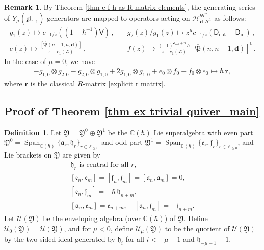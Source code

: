 \documentclass[10pt]{amsart}
\theoremstyle{definition}
\newtheorem{Definition}[Theorem]{Definition}
\newtheorem{Remark}[Theorem]{Remark}
\numberwithin{equation}{section}
\newcommand{\bC}{\mathbb{C}}
\newcommand{\bZ}{\mathbb{Z}}
\newcommand{\bd}{\mathbf{d}}
\newcommand{\cH}{\mathcal{H}}
\newcommand{\sA}{\mathsf{A}}
\newcommand{\sW}{\mathsf{W}}
\newcommand{\Span}{\operatorname{Span}}
\newcommand{\In}{\operatorname{in}}
\newcommand{\Out}{\operatorname{out}}
\begin{document}
\begin{Remark}
By Theorem \ref{thm e f h as R matrix elements}, the generating series of $Y_\mu(\mathfrak{gl}_{1|1})$ generators are mapped to operators acting on $\cH^{\sW^{\mathrm{fr}}}_{\underline{\bd},\sA^{\mathrm{fr}}}$ as follows:
\begin{align*}
g_1(z)\mapsto c_{-1/z}((1-\hbar^{-1})\mathsf V)\,, \quad & g_2(z)/g_1(z)\mapsto z^{\mu}c_{-1/z}(\mathsf D_{\Out}-\mathsf D_{\In})\,,\\
e(z)\mapsto \frac{[\overline{\mathfrak{P}}(n+1,n,\underline{\bd})]}{z-c_1(\mathcal L)}\,,\quad & f(z)\mapsto \frac{(-1)^{\bd_{\Out}+n}\,\hbar}{z-c_1(\mathcal L)}[\overline{\mathfrak{P}}(n,n-1,\underline{\bd})]^{\mathrm{t}}\,.
\end{align*}
In the case of $\mu=0$, we have
\begin{align}\label{r-mat gl(1|1)}
-g_{1,0}\otimes g_{2,0}-g_{2,0}\otimes g_{1,0}+2g_{1,0}\otimes g_{1,0}+e_0\otimes f_0-f_0\otimes e_0\mapsto \hbar\,\pmb r,
\end{align}
where $\pmb r$ is the classical 
$R$-matrix \eqref{explicit r matrix}.
\end{Remark}

\subsection{Proof of Theorem \ref{thm ex trivial quiver_main}}
\begin{Definition}
Let $\mathfrak{Y}=\mathfrak{Y}^0\oplus \mathfrak{Y}^1$ be the $\bC(\hbar)$ Lie superalgebra with even part $\mathfrak{Y}^0=\Span_{\bC(\hbar)}\{\mathfrak{a}_r,\mathfrak{h}_r\}_{r\in \bZ_{\geqslant0}}$ and odd part $\mathfrak{Y}^1=\Span_{\bC(\hbar)}\{\mathfrak{e}_r,\mathfrak{f}_r\}_{r\in \bZ_{\geqslant0}}$, and Lie brackets on $\mathfrak{Y}$ are given by
\begin{equation}\label{bracket of frak Y}
\begin{gathered}
\mathfrak{h}_{r}\text{ is central for all $r$},\\
[\mathfrak{e}_n,\mathfrak{e}_m]=[\mathfrak{f}_n,\mathfrak{f}_m]=[\mathfrak{a}_n,\mathfrak{a}_m]=0,\\
[\mathfrak{e}_n,\mathfrak{f}_m]=-\hbar\,\mathfrak{h}_{n+m},\\
[\mathfrak{a}_n,\mathfrak{e}_m]=\mathfrak{e}_{n+m},\quad [\mathfrak{a}_n,\mathfrak{f}_m]=-\mathfrak{f}_{n+m}.
\end{gathered}
\end{equation}
Let $\mathcal U(\mathfrak{Y})$ be the enveloping algebra (over $\bC(\hbar)$) of $\mathfrak{Y}$. Define $\mathcal U_0(\mathfrak{Y})=\mathcal U(\mathfrak{Y})$, and for $\mu<0$, define $\mathcal U_\mu(\mathfrak{Y})$ to be the quotient of $\mathcal U(\mathfrak{Y})$ by the two-sided ideal generated by $\mathfrak{h}_{i}$ for all $i<-\mu-1$ and $\mathfrak{h}_{-\mu-1}-1$.
\end{Definition}
\end{document}
